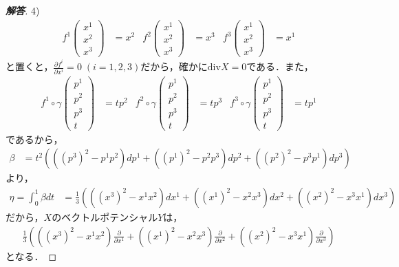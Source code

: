\documentclass[dvipdfmx,nosetpagesize, uplatex]{jsarticle}
\theoremstyle{definition}
\theoremstyle{StatementsWithStar}
\theoremstyle{StatementsWithStar2}
\theoremstyle{StatementsWithStar3}
\theoremstyle{StatementsWithCCirc}
\theoremstyle{definition}
\begin{document}
\begin{proof}[\bf{解答}]
4) 
\begin{align*}
    f^1\begin{pmatrix}x^1\\x^2\\x^3\end{pmatrix} &= x^2 & f^2\begin{pmatrix}x^1\\x^2\\x^3\end{pmatrix} &= x^3 & f^3\begin{pmatrix}x^1\\x^2\\x^3\end{pmatrix} &= x^1
\end{align*}
と置くと，$\frac{\partial f^i}{\partial x^i}=0\;(i=1,2,3)$だから，確かに$\mathrm{div}X=0$である．また，
\begin{align*}
    f^1\circ\gamma\begin{pmatrix}p^1\\p^2\\p^3\\t\end{pmatrix} &= tp^2 & f^2\circ\gamma\begin{pmatrix}p^1\\p^2\\p^3\\t\end{pmatrix} &= tp^3 &f^3\circ\gamma\begin{pmatrix}p^1\\p^2\\p^3\\t\end{pmatrix} &= tp^1
\end{align*}
であるから，
\begin{align*}
    \beta &= t^2\left( ((p^3)^2-p^1p^2)dp^1 + ((p^1)^2-p^2p^3)dp^2 + ((p^2)^2-p^3p^1)dp^3 \right)
\end{align*}
より，
\begin{align*}
    \eta = \int^1_0\beta dt &= \frac{1}{3}\left( ((x^3)^2-x^1x^2)dx^1 + ((x^1)^2-x^2x^3)dx^2 + ((x^2)^2-x^3x^1)dx^3 \right)
\end{align*}
だから，$X$のベクトルポテンシャル$Y$は，
\begin{align*}
    \frac{1}{3}\left( ((x^3)^2-x^1x^2)\frac{\partial}{\partial x^1} + ((x^1)^2-x^2x^3)\frac{\partial}{\partial x^2} + ((x^2)^2-x^3x^1)\frac{\partial}{\partial x^3} \right)
\end{align*}
となる．

\end{proof}
\end{document}
